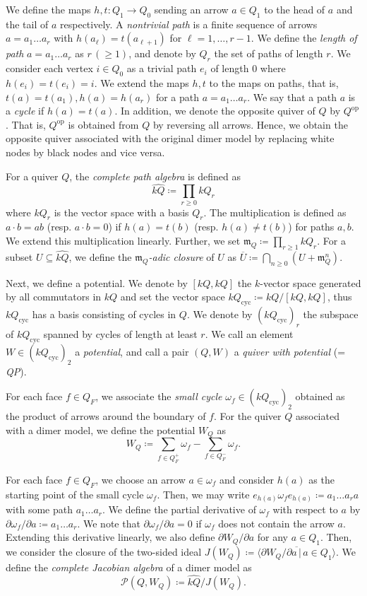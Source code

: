 \documentclass[ALCO,ThmDefs,Unicode]{cedram}
\newcommand{\calP}{\mathcal{P}}
\newcommand{\fkm}{\mathfrak{m}}
\DeclareMathOperator{\op}{op}
\begin{document}
We define the maps $h, t:Q_1\rightarrow Q_0$ sending an arrow $a\in Q_1$ to the head of $a$ and the tail of $a$ respectively. A \emph{nontrivial path} is a finite sequence of arrows $a=a_1\dots a_r$ with $h(a_\ell)=t(a_{\ell+1})$ for $\ell=1, \dots ,r-1$. We define the \emph{length of path} $a=a_1\dots a_r$ as $r \,(\ge 1)$, and denote by $Q_r$ the set of paths of length $r$. We consider each vertex $i\in Q_0$ as a trivial path $e_i$ of length $0$ where $h(e_i)=t(e_i)=i$. We extend the maps $h, t$ to the maps on paths, that is, $t(a)=t(a_1), h(a)=h(a_r)$ for a path $a=a_1\dots a_r$. We say that a path $a$ is a \emph{cycle} if $h(a)=t(a)$. In addition, we denote the opposite quiver of $Q$ by $Q^{\op}$. That is, $Q^{\op}$ is obtained from $Q$ by reversing all arrows. Hence, we obtain the opposite quiver associated with the original dimer model by replacing white nodes by black nodes and vice versa.

For a quiver $Q$, the \emph{complete path algebra} is defined as
\[
\widehat{kQ}\coloneqq\prod_{r\ge 0}kQ_r
\]
where $kQ_r$ is the vector space with a basis $Q_r$. The multiplication is defined as $a\cdot b=ab$ (resp. $a\cdot b=0$) if $h(a)=t(b)$ (resp. $h(a)\neq t(b)$) for paths $a, b$. We extend this multiplication linearly. Further, we set $\fkm_Q\coloneqq \prod_{r\ge 1}kQ_r$. For a subset $U\subseteq\widehat{kQ}$, we define the \emph{$\fkm_Q$-adic closure} of $U$ as $\overline{U}\coloneqq \bigcap_{n\ge 0}(U+\fkm_Q^n)$.

Next, we define a potential. We denote by $[kQ, kQ]$ the $k$-vector space generated by all commutators in $kQ$ and set the vector space $kQ_{\mathrm{cyc}}\coloneqq kQ/[kQ, kQ]$, thus $kQ_{\mathrm{cyc}}$ has a basis consisting of cycles in $Q$. We denote by $(kQ_{\mathrm{cyc}})_r$ the subspace of $kQ_{\mathrm{cyc}}$ spanned by cycles of length at least $r$. We call an element $W\in (kQ_{\mathrm{cyc}})_2$ a \emph{potential}, and call a pair $(Q,W)$ a \emph{quiver with potential} (= \emph{QP}).

For each face $f\in Q_F$, we associate the \emph{small cycle} $\omega_f\in (kQ_{\mathrm{cyc}})_2$ obtained as the product of arrows around the boundary of $f$. For the quiver $Q$ associated with a dimer model, we define the potential $W_Q$ as
\[
W_Q\coloneqq \sum_{f\in Q^+_F}\omega_f-\sum_{f\in Q^-_F}\omega_f.
\]

For each face $f\in Q_F$, we choose an arrow $a\in \omega_f$ and consider $h(a)$ as the starting point of the small cycle $\omega_f$. Then, we may write $e_{h(a)}\omega_fe_{h(a)}\coloneqq a_1\dots a_ra$ with some path $a_1\dots a_r$. We define the partial derivative of $\omega_f$ with respect to $a$ by $\partial \omega_f/\partial a\coloneqq a_1\dots a_r$. We note that $\partial \omega_f/\partial a=0$ if $\omega_f$ does not contain the arrow $a$. Extending this derivative linearly, we also define $\partial W_Q/\partial a$ for any $a\in Q_1$. Then, we consider the closure of the two-sided ideal $J(W_Q)\coloneqq \langle\overline{\partial W_Q/\partial a\,|\,a\in Q_1}\rangle$. We define the \emph{complete Jacobian algebra} of a dimer model as
\[
\calP(Q, W_Q)\coloneqq \widehat{kQ}/J(W_Q).
\]
\end{document}
